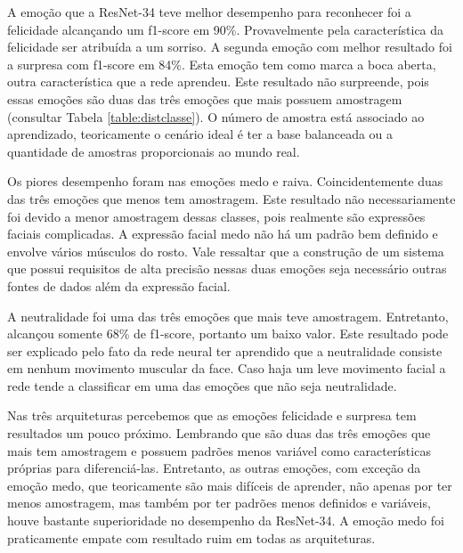 A emoção que a ResNet-34 teve melhor desempenho para reconhecer foi a felicidade alcançando um f1-score em 90\%. Provavelmente pela característica da felicidade ser atribuída a um sorriso. A segunda emoção com melhor resultado foi a surpresa com f1-score em 84\%. Esta emoção tem como marca a boca aberta, outra característica que a rede aprendeu. Este resultado não surpreende, pois essas emoções são duas das três emoções que mais possuem amostragem (consultar Tabela \ref{table:distclasse}). O número de amostra está associado ao aprendizado, teoricamente o cenário ideal é ter a base balanceada ou a quantidade de amostras proporcionais ao mundo real.

Os piores desempenho foram nas emoções medo e raiva. Coincidentemente duas das três emoções que menos tem amostragem. Este resultado não necessariamente foi devido a menor amostragem dessas classes, pois realmente são expressões faciais complicadas. A expressão facial medo não há um padrão bem definido e envolve vários músculos do rosto. Vale ressaltar que a construção de um sistema que possui requisitos de alta precisão nessas duas emoções seja necessário outras fontes de dados além da expressão facial. 

A neutralidade foi uma das três emoções que mais teve amostragem. Entretanto, alcançou somente 68\% de f1-score, portanto um baixo valor. Este resultado pode ser explicado pelo fato da rede neural ter aprendido que a neutralidade consiste em nenhum movimento muscular da face. Caso haja um leve movimento facial a rede tende a classificar em uma das emoções que não seja neutralidade.

Nas três arquiteturas percebemos que as emoções felicidade e surpresa tem resultados um pouco próximo. Lembrando que são duas das três emoções que mais tem amostragem e possuem padrões menos variável como características próprias para diferenciá-las. Entretanto, as outras emoções, com exceção da emoção medo, que teoricamente são mais difíceis de aprender, não apenas por ter menos amostragem, mas também por ter padrões menos definidos e variáveis, houve bastante superioridade no desempenho da ResNet-34. A emoção medo foi praticamente empate com resultado ruim em todas as arquiteturas. 





